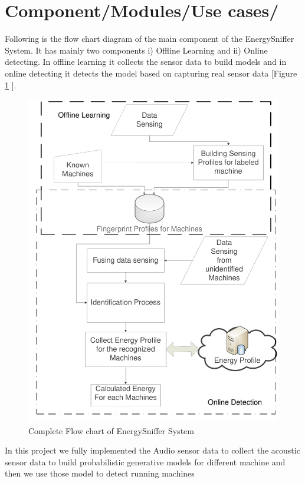 \documentclass[11pt]{amsart}
\begin{document}
\section{Component/Modules/Use cases/}

Following is the flow chart diagram of the main component of the EnergySniffer System. It has mainly two components i) Offline Learning and ii) Online detecting. In offline learning it collects the sensor data to build models and in online detecting it detects the model based on capturing real sensor data [Figure \ref{fig:flowchart} ].

  
\begin{figure}[htb]
\begin{center}
\includegraphics[width=1.0\linewidth, angle = 0]{Flowchart.pdf}
\caption{Complete Flow chart of EnergySniffer System} \label{fig:flowchart}
\end{center}
\end{figure}

In this project we fully implemented the Audio sensor data to collect the acoustic sensor data to build probabilistic generative models for different machine and then we use those model to detect running machines 
\end{document}
